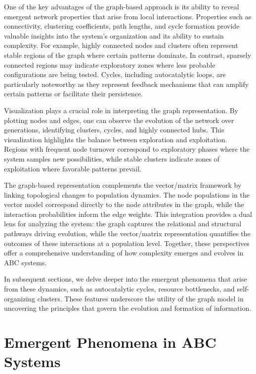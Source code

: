\documentclass[%
 preprint, linenumbers,
 amsmath,amssymb,
 aps, physrev,
]{revtex4-2}
\begin{document}
One of the key advantages of the graph-based approach is its ability to reveal emergent network properties that arise from local interactions. Properties such as connectivity, clustering coefficients, path lengths, and cycle formation provide valuable insights into the system’s organization and its ability to sustain complexity. For example, highly connected nodes and clusters often represent stable regions of the graph where certain patterns dominate. In contrast, sparsely connected regions may indicate exploratory zones where less probable configurations are being tested. Cycles, including autocatalytic loops, are particularly noteworthy as they represent feedback mechanisms that can amplify certain patterns or facilitate their persistence.

Visualization plays a crucial role in interpreting the graph representation. By plotting nodes and edges, one can observe the evolution of the network over generations, identifying clusters, cycles, and highly connected hubs. This visualization highlights the balance between exploration and exploitation. Regions with frequent node turnover correspond to exploratory phases where the system samples new possibilities, while stable clusters indicate zones of exploitation where favorable patterns prevail.

The graph-based representation complements the vector/matrix framework by linking topological changes to population dynamics. The node populations in the vector model correspond directly to the node attributes in the graph, while the interaction probabilities inform the edge weights. This integration provides a dual lens for analyzing the system: the graph captures the relational and structural pathways driving evolution, while the vector/matrix representation quantifies the outcomes of these interactions at a population level. Together, these perspectives offer a comprehensive understanding of how complexity emerges and evolves in ABC systems.

In subsequent sections, we delve deeper into the emergent phenomena that arise from these dynamics, such as autocatalytic cycles, resource bottlenecks, and self-organizing clusters. These features underscore the utility of the graph model in uncovering the principles that govern the evolution and formation of information.

\section{Emergent Phenomena in ABC Systems}
\end{document}
